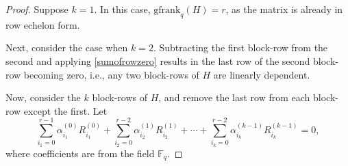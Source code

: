 \documentclass[conference]{IEEEtran}
\begin{document}
\begin{proof} Suppose  $k = 1.$ In this case, $\mathrm{gfrank}_{q}(H) = r$, as the matrix is already in row echelon form.

Next, consider the case when \( k = 2 \). Subtracting the first block-row from the second and applying \eqref{sumofrowzero} results in the last row of the second block-row becoming zero, i.e., any two block-rows  of $H$ are linearly dependent.

Now, consider the $k$ block-rows of $H$, and remove the last row from each block-row except the first. Let
\begin{equation} \label{linearcombi}
			\sum_{i_{1}=0}^{r-1}\alpha_{i_{1}}^{(0)}R^{(0)}_{i_{1}}+\sum_{i_{2}=0}^{r-2}\alpha_{i_{2}}^{(1)}R^{(1)}_{i_{2}}+\cdots+\sum_{i_{k}=0}^{r-2}\alpha_{i_{k}}^{(k-1)}R^{(k-1)}_{i_{k}}=0,
		\end{equation}
        where coefficients are from the field $\mathbb{F}_{q}$. 
        

\end{proof}
\end{document}

